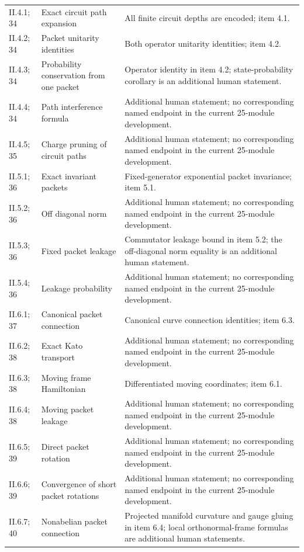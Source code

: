 \begin{longtable}{@{}p{.13\linewidth}p{.34\linewidth}p{.46\linewidth}@{}}
II.4.1; 34 & Exact circuit path expansion & All finite circuit depths are encoded; item 4.1.\\
II.4.2; 34 & Packet unitarity identities & Both operator unitarity identities; item 4.2.\\
II.4.3; 34 & Probability conservation from one packet & Operator identity in item 4.2; state-probability corollary is an additional human statement.\\
II.4.4; 34 & Path interference formula & Additional human statement; no corresponding named endpoint in the current 25-module development.\\
II.4.5; 35 & Charge pruning of circuit paths & Additional human statement; no corresponding named endpoint in the current 25-module development.\\
II.5.1; 36 & Exact invariant packets & Fixed-generator exponential packet invariance; item 5.1.\\
II.5.2; 36 & Off diagonal norm & Additional human statement; no corresponding named endpoint in the current 25-module development.\\
II.5.3; 36 & Fixed packet leakage & Commutator leakage bound in item 5.2; the off-diagonal norm equality is an additional human statement.\\
II.5.4; 36 & Leakage probability & Additional human statement; no corresponding named endpoint in the current 25-module development.\\
II.6.1; 37 & Canonical packet connection & Canonical curve connection identities; item 6.3.\\
II.6.2; 38 & Exact Kato transport & Additional human statement; no corresponding named endpoint in the current 25-module development.\\
II.6.3; 38 & Moving frame Hamiltonian & Differentiated moving coordinates; item 6.1.\\
II.6.4; 38 & Moving packet leakage & Additional human statement; no corresponding named endpoint in the current 25-module development.\\
II.6.5; 39 & Direct packet rotation & Additional human statement; no corresponding named endpoint in the current 25-module development.\\
II.6.6; 39 & Convergence of short packet rotations & Additional human statement; no corresponding named endpoint in the current 25-module development.\\
II.6.7; 40 & Nonabelian packet connection & Projected manifold curvature and gauge gluing in item 6.4; local orthonormal-frame formulas are additional human statements.\\

\end{longtable}
